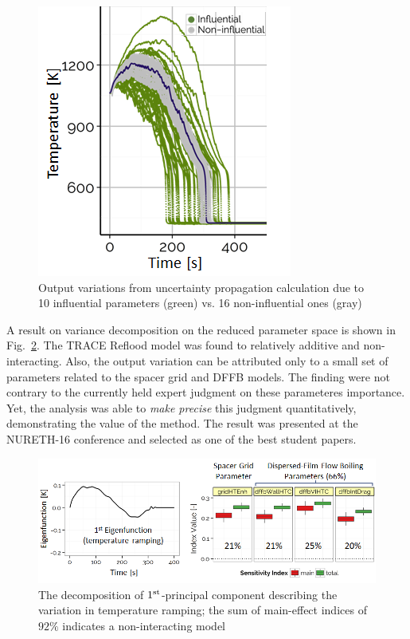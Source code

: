 \documentclass[11pt,titlepage]{article}
\begin{document}
\begin{figure}[h!]
	\centering
	\includegraphics[scale=0.75]{figures/influentialRuns.png}
	\caption{Output variations from uncertainty propagation calculation due to 10 influential parameters (green) vs. 16 non-influential ones (gray)}
	\label{fig:influential}
\end{figure}

A result on variance decomposition on the reduced parameter space is shown in Fig.~\ref{fig:1stpc}.
The TRACE Reflood model was found to relatively additive and non-interacting.
Also, the output variation can be attributed only to a small set of parameters related to the spacer grid and DFFB models. 
The finding were not contrary to the currently held expert judgment on these parameteres importance.
Yet, the analysis was able to \emph{make precise} this judgment quantitatively, demonstrating the value of the method.
The result was presented at the NURETH-16 conference \cite{Wicaksono2015a} and selected as one of the best student papers.

\begin{figure}[h!]
	\centering
	\includegraphics[scale=0.65]{figures/1stPrincipalComponent.png}
	\caption{The decomposition of $1^\textnormal{st}$-principal component describing the variation in temperature ramping; the sum of main-effect indices of $92\%$ indicates a non-interacting model}
	\label{fig:1stpc}
\end{figure}
\end{document}
